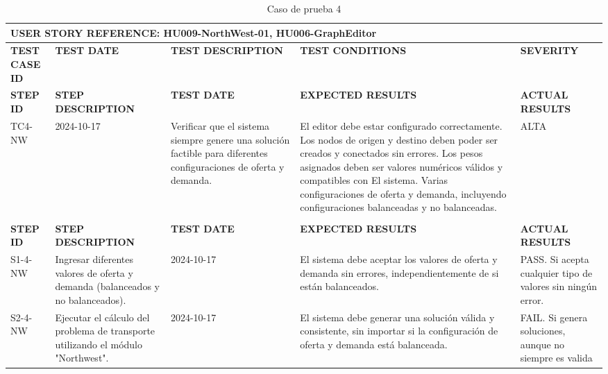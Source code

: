\begin{longtable}{|p{2cm}|p{3cm}|p{3cm}|p{3cm}|p{3cm}|}
    \caption{Caso de prueba 4} \label{tab:casos_prueba4} \\
    \hline
    \multicolumn{5}{|l|}{\textbf{USER STORY REFERENCE: HU009-NorthWest-01, HU006-GraphEditor}} \\ \hline
    \textbf{TEST CASE ID} & \textbf{TEST DATE} & \textbf{TEST DESCRIPTION} & \textbf{TEST CONDITIONS} & \textbf{SEVERITY} \\ \hline

    \endfirsthead
    \hline
    \textbf{STEP ID} & \textbf{STEP DESCRIPTION} & \textbf{TEST DATE} & \textbf{EXPECTED RESULTS} & \textbf{ACTUAL RESULTS} \\ \hline
    \endhead
    TC4-NW & 2024-10-17 & Verificar que el sistema siempre genere una solución factible para diferentes configuraciones de oferta y demanda. & El editor debe estar configurado correctamente. Los nodos de origen y destino deben poder ser creados y conectados sin errores. Los pesos asignados deben ser valores numéricos válidos y compatibles con El sistema. Varias configuraciones de oferta y demanda, incluyendo configuraciones balanceadas y no balanceadas. & ALTA                                                                                           \\ \\ \hline
    \textbf{STEP ID} & \textbf{STEP DESCRIPTION} & \textbf{TEST DATE} & \textbf{EXPECTED RESULTS} & \textbf{ACTUAL RESULTS} \\ \hline
    S1-4-NW & Ingresar diferentes valores de oferta y demanda (balanceados y no balanceados). & 2024-10-17 & El sistema debe aceptar los valores de oferta y demanda sin errores, independientemente de si están balanceados. & PASS. Si acepta cualquier tipo de valores sin ningún error. \\ \hline
    S2-4-NW & Ejecutar el cálculo del problema de transporte utilizando el módulo "Northwest". & 2024-10-17 & El sistema debe generar una solución válida y consistente, sin importar si la configuración de oferta y demanda está balanceada. & FAIL. Si genera soluciones, aunque no siempre es valida \\ \hline
\end{longtable}

